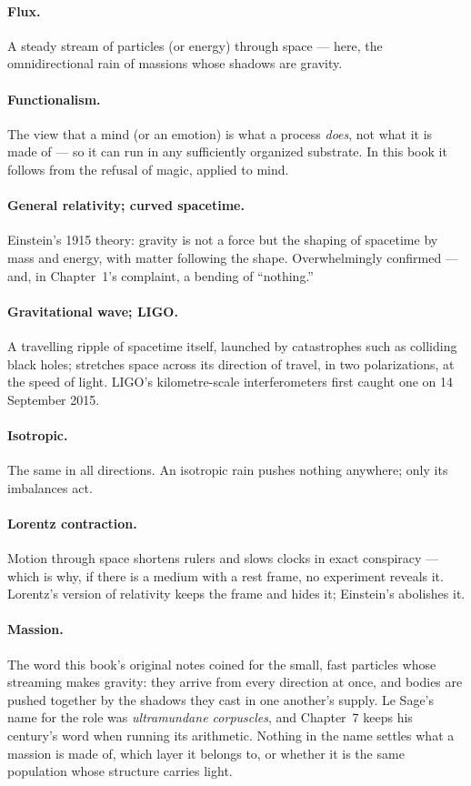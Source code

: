 \documentclass[fontsize=11pt,paper=a4,pagesize=auto,parskip=half-]{scrbook}
\begin{document}
\paragraph{Flux.} A steady stream of particles (or energy) through space --- here, the omnidirectional rain of massions whose shadows are gravity.

\paragraph{Functionalism.} The view that a mind (or an emotion) is what a process \emph{does}, not what it is made of --- so it can run in any sufficiently organized substrate. In this book it follows from the refusal of magic, applied to mind.

\paragraph{General relativity; curved spacetime.} Einstein's 1915 theory: gravity is not a force but the shaping of spacetime by mass and energy, with matter following the shape. Overwhelmingly confirmed --- and, in Chapter~1's complaint, a bending of ``nothing.''

\paragraph{Gravitational wave; LIGO.} A travelling ripple of spacetime itself, launched by catastrophes such as colliding black holes; stretches space across its direction of travel, in two polarizations, at the speed of light. LIGO's kilometre-scale interferometers first caught one on 14 September 2015.

\paragraph{Isotropic.} The same in all directions. An isotropic rain pushes nothing anywhere; only its imbalances act.

\paragraph{Lorentz contraction.} Motion through space shortens rulers and slows clocks in exact conspiracy --- which is why, if there is a medium with a rest frame, no experiment reveals it. Lorentz's version of relativity keeps the frame and hides it; Einstein's abolishes it.

\paragraph{Massion.} The word this book's original notes coined for the small, fast particles whose streaming makes gravity: they arrive from every direction at once, and bodies are pushed together by the shadows they cast in one another's supply. Le Sage's name for the role was \emph{ultramundane corpuscles}, and Chapter~7 keeps his century's word when running its arithmetic. Nothing in the name settles what a massion is made of, which layer it belongs to, or whether it is the same population whose structure carries light.
\end{document}
